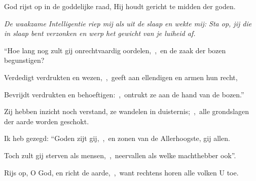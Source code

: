 \documentclass[12pt,twoside,a5paper]{article}
\begin{document}





\begin{halfparskip}
  God rijst op in de goddelijke raad, Hij houdt gericht te midden der goden.


   \emph{De waakzame Intelligentie riep mij als uit de slaap en wekte mij: Sta op, jij die in slaap bent verzonken en werp het gewicht van je luiheid af.}

  ``Hoe lang nog zult gij onrechtvaardig oordelen,~\sep\ en de zaak der bozen begunstigen?

  Verdedigt verdrukten en wezen,~\sep\ geeft aan ellendigen en armen hun recht,

  Bevrijdt verdrukten en behoeftigen:~\sep\ ontrukt ze aan de hand van de bozen.''

  Zij hebben inzicht noch verstand, ze wandelen in duisternis;~\sep\ alle grondslagen der aarde worden geschokt.

  Ik heb gezegd: ``Goden zijt gij,~\sep\ en zonen van de Allerhoogste, gij allen.

  Toch zult gij sterven als mensen,~\sep\ neervallen als welke machthebber ook''.

  Rijs op, O God, en richt de aarde,~\sep\ want rechtens horen alle volken U toe.
\end{halfparskip}

\end{document}
